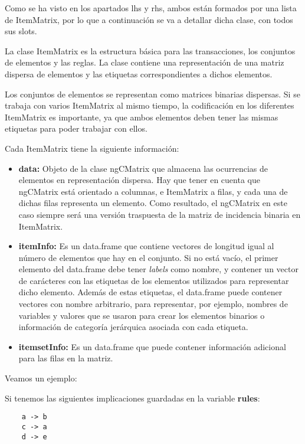 Como se ha visto en los apartados lhs y rhs, ambos est\'an formados por una lista de 
ItemMatrix, por lo que a continuaci\'on se va a detallar dicha clase, con todos sus slots.

La clase ItemMatrix es la estructura b\'asica para las transacciones, los 
conjuntos de elementos y las reglas.
La clase contiene una representaci\'on de una matriz dispersa de elementos 
y las etiquetas correspondientes a dichos elementos.

Los conjuntos de elementos se representan como matrices binarias dispersas. 
Si se trabaja con varios ItemMatrix al mismo tiempo, la codificaci\'on 
en los diferentes ItemMatrix es importante, ya que ambos elementos deben tener 
las mismas etiquetas para poder trabajar con ellos.

Cada ItemMatrix tiene la siguiente informaci\'on:
\begin{itemize}

    \item \textbf{data:}
    Objeto de la clase ngCMatrix que almacena las ocurrencias de elementos en 
    representaci\'on dispersa. Hay que tener en cuenta que ngCMatrix est\'a orientado 
    a columnas, e ItemMatrix a filas, y cada una de dichas filas representa un elemento.
    Como resultado, el ngCMatrix en este caso siempre ser\'a una versi\'on traspuesta 
    de la matriz de incidencia binaria en ItemMatrix.


    \item \textbf{itemInfo:}
    Es un data.frame que contiene vectores de longitud igual al n\'umero de elementos que 
    hay en el conjunto. Si no est\'a vac\'io, el primer elemento del data.frame debe tener 
    \textit{labels} como nombre, y contener un vector de car\'acteres con las etiquetas de los 
    elementos utilizados para representar dicho elemento. Adem\'as de estas etiquetas, el 
    data.frame puede contener vectores con nombre arbitrario, para representar, por ejemplo, 
    nombres de variables y valores que se usaron para crear los elementos binarios o 
    informaci\'on de categor\'ia jer\'arquica asociada con cada etiqueta.


    \item \textbf{itemsetInfo:}
    Es un data.frame que puede contener informaci\'on adicional para las filas en la matriz.

\end{itemize}


Veamos un ejemplo:

Si tenemos las siguientes implicaciones guardadas en la variable \textbf{rules}:
\begin{verbatim}
    a -> b
    c -> a
    d -> e
\end{verbatim}


